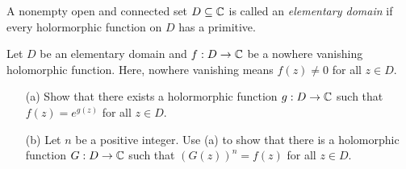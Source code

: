 \documentclass[a4paper]{article}
\begin{document}
\begin{problem}
   A nonempty open and connected set \( D \subseteq  \mathbb{C}   \) is called an  \textit{elementary domain} if every holormorphic function on \( D  \) has a primitive.

   Let \( D  \) be an elementary domain and \( f: D \to \mathbb{C}  \) be a nowhere vanishing holomorphic function. Here, nowhere vanishing means \( f(z) \neq 0  \) for all \( z \in D  \).
   \begin{enumerate}
       \item[(a)] Show that there exists a holormorphic function \( g : D \to \mathbb{C}  \) such that \( f(z) = e^{g(z)} \) for all \( z \in D  \). 
        \item[(b)] Let \( n  \) be a positive integer. Use (a) to show that there is a holomorphic function \( G : D \to \mathbb{C}  \) such that \( (G(z))^{n} = f(z)  \) for all \( z \in D  \).
   \end{enumerate}
\end{problem}
\end{document}
